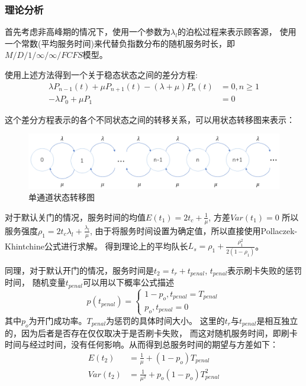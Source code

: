 \subsubsection{理论分析}
首先考虑非高峰期的情况下，使用一个参数为$\lambda_{l}$的泊松过程来表示顾客源，
使用一个常数(平均服务时间)来代替负指数分布的随机服务时长，即$M/D/1/\infty/\infty/FCFS$模型。

使用上述方法得到一个关于稳态状态之间的差分方程:
\begin{equation}
    \begin{aligned}
        \lambda P_{n-1}(t)+\mu P_{n+1}(t)-(\lambda+\mu )P_n(t)&=0,n\geq 1 \\
        -\lambda P_{0}+\mu P_{1}&=0
    \end{aligned}
\end{equation}

这个差分方程表示的各个不同状态之间的转移关系，可以用状态转移图来表示：
\begin{figure}[ht]    
    \centering
    \includegraphics[width=.7\textwidth]{images/transform1.PNG}
    \caption{单通道状态转移图}
    \label{fig:transform1}
\end{figure}
\par 对于默认关门的情况，服务时间的均值$E(t_1)=2t_c+\frac{1}{\mu}$,
方差$Var(t_1)=0$
所以服务强度$\rho_1=2t_c\lambda_l+\frac{\lambda_l}{\mu}$,
由于将服务时间设置为确定值，所以直接使用Pollaczek-Khintchine公式进行求解。
得到理论上的平均队长$L_s=\rho_1+\frac{\rho_1^2}{2(1-\rho_1)}$。
\par 同理，对于默认开门的情况，服务时间是$t_2=t_r+t_{penal}$,
$t_{penal}$表示刷卡失败的惩罚时间，
随机变量$t_{penal}$可以用以下概率公式描述
\begin{equation}
    p(t_{penal})=
    \begin{cases}
        1-p_o,t_{penal}=T_{penal} \\
        p_o,t_{penal}=0
    \end{cases}
\end{equation}
其中$p_o$为开门成功率。$T_{penal}$为惩罚的具体时间大小。
这里的$t_r$与$t_{penal}$是相互独立的，因为后者是否存在仅仅取决于是否刷卡失败，
而这对随机服务时间，即刷卡时间与经过时间，没有任何影响。从而得到总服务时间的期望与方差如下：
\begin{equation}
    \begin{aligned}
        E(t_2) &=\frac{1}{\mu}+(1-p_o)T_{penal} \\
        Var(t_2)&=\frac{1}{\mu^2}+p_o(1-p_o)T_{penal}^2
    \end{aligned}
\end{equation}

